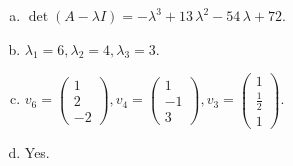 \begin{questions}
\begin{solution}
\begin{enumerate}[(a)]
\item $\det(A-\lambda I)=-{\lambda}^{3} + 13 \, {\lambda}^{2} - 54 \, {\lambda} + 72$.
\item ${\lambda}_1=6, {\lambda}_2=4, {\lambda}_3=3$.
\item $v_{6}=\left(\begin{array}{r}
1 \\
2 \\
-2
\end{array}\right), v_{4}=\left(\begin{array}{r}
1 \\
-1 \\
3
\end{array}\right), v_{3}=\left(\begin{array}{r}
1 \\
\frac{1}{2} \\
1
\end{array}\right)$.
\item Yes.
\end{enumerate}
\end{solution}

\end{questions}

\newpage


\begin{center}
\end{center}

